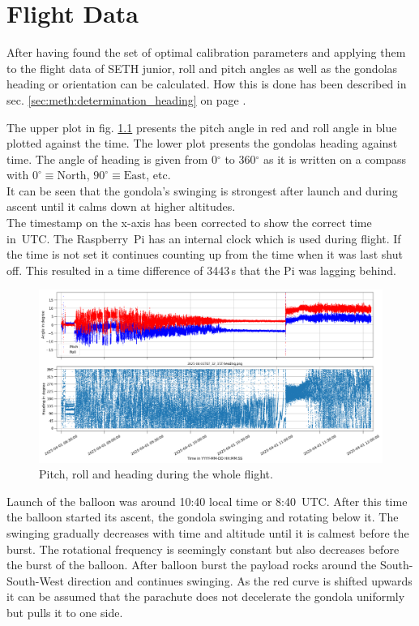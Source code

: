 \chapter{Flight Data \label{ch:flight_data}}
After having found the set of optimal calibration parameters and applying them to the flight data of \ac{SETH} junior, roll and pitch angles as well as the gondolas heading or orientation can be calculated. How this is done has been described in sec. \ref{sec:meth:determination_heading} on page \pageref{sec:meth:determination_heading}.

The upper plot in fig. \ref{fig:res:flight_heading} presents the pitch angle in red and roll angle in blue plotted against the time. The lower plot presents the gondolas heading against time. The angle of heading is given from 0$^\circ$ to 360$^\circ$ as it is written on a compass with $0^\circ\equiv\mathrm{North}$, $90^\circ\equiv\mathrm{East}$, etc.\\
It can be seen that the gondola's swinging is strongest after launch and during ascent until it calms down at higher altitudes.\\
The timestamp on the x-axis has been corrected to show the correct time in~UTC. The Raspberry~Pi has an internal clock which is used during flight. If the time is not set it continues counting up from the time when it was last shut off. This resulted in a time difference of 3443\,s that the Pi was lagging behind.

\begin{figure}[H]
    \centering
    \includegraphics[width=\linewidth]{images/04_results/flight_heading.png}
    \caption{Pitch, roll and heading during the whole flight.}
    \label{fig:res:flight_heading}
\end{figure}

Launch of the balloon was around 10:40 local time or 8:40~UTC. After this time the balloon started its ascent, the gondola swinging and rotating below it. The swinging gradually decreases with time and altitude until it is calmest before the burst. The rotational frequency is seemingly constant but also decreases before the burst of the balloon. After balloon burst the payload rocks around the South-South-West direction and continues swinging. As the red curve is shifted upwards it can be assumed that the parachute does not decelerate the gondola uniformly but pulls it to one side.

